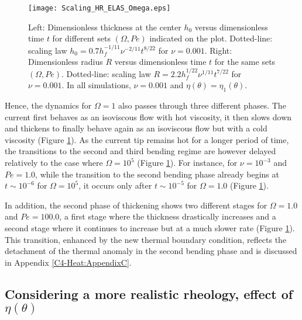 \begin{figure}[h!]
  \begin{center}
    \graphicspath{ {/Users/thorey/Documents/These/Projet/Refroidissement/Skin_Model/Figure/Figure_Heating/} }
    \texttt{[image: Scaling\_HR\_ELAS\_Omega.eps]}
    \caption{Left: Dimensionless thickness at  the center $h_0$ versus
      dimensionless   time  $t$   for  different   sets  $(\Omega,Pe)$
      indicated    on   the    plot.     Dotted-line:   scaling    law
      $h_0=   0.7h_f^{-1/11}\nu^{-2/11}t^{8/22}$    for   $\nu=0.001$.
      Right: Dimensionless  radius $R$  versus dimensionless  time $t$
      for  the  same  sets $(\Omega,Pe)$.   Dotted-line:  scaling  law
      $R= 2.2h_f^{1/22}\nu^{1/11}t^{7/22}$ for $\nu  = 0.001$.  In all
      simulations, $\nu=0.001$ and $\eta(\theta)=\eta_1(\theta)$.}
    \label{C4-Scaling_HR_ELAS_Omega}
  \end{center}
\end{figure}


Hence, the dynamics for $\Omega=1$ also passes through three different
phases.   The current  first behaves  as an  isoviscous flow  with hot
viscosity, it then slows down and  thickens to finally behave again as
an   isoviscous    flow   but   with   a    cold   viscosity   (Figure
\ref{C4-Scaling_HR_ELAS_Omega}).  As the current tip remains hot for a
longer period of time, the transitions to the second and third bending
regime are however delayed relatively to the case where $\Omega= 10^5$
(Figure    \ref{C4-Scaling_HR_ELAS_Omega}).     For   instance,    for
$\nu=10^{-3}$ and $Pe=1.0$, while the transition to the second bending
phase already begins at $t\sim 10^{-6}$ for $\Omega=10^{5}$, it occurs
only    after   $t\sim    10^{-5}$   for    $\Omega=   1.0$    (Figure
\ref{C4-Scaling_HR_ELAS_Omega}).

In addition, the second phase of thickening shows two different stages
for $\Omega =  1.0$ and $Pe=100.0$, a first stage  where the thickness
drastically  increases  and  a  second stage  where  it  continues  to
increase     but     at     a     much     slower     rate     (Figure
\ref{C4-Scaling_HR_ELAS_Omega}).  This transition, enhanced by the new
thermal  boundary condition,  reflects the  detachment of  the thermal
anomaly  in the  second bending  phase  and is  discussed in  Appendix
\ref{C4-Heat:AppendixC}.

\subsection{Considering   a  more   realistic   rheology,  effect   of
  $\eta(\theta)$}
\label{C4-sec:infl-therm-bound-el}


